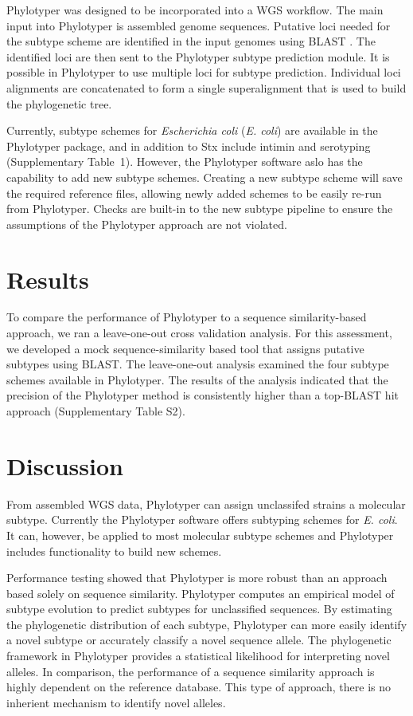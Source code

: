 \documentclass{bioinfo}
\begin{document}
Phylotyper was designed to be incorporated into a WGS workflow.  
The main input into Phylotyper is assembled genome sequences.  
Putative loci needed for the subtype scheme are identified in the input genomes using BLAST \citep{Camacho2009}.
The identified loci are then sent to the Phylotyper subtype prediction module.
It is possible in Phylotyper to use multiple loci for subtype prediction.
Individual loci alignments are concatenated to form a single superalignment that is used to build the phylogenetic tree.

Currently, subtype schemes for \emph{Escherichia coli} (\textit{E. coli}) are available in the Phylotyper package, and in addition to Stx include intimin and serotyping  (Supplementary Table~1).
However, the Phylotyper software aslo has the capability to add new subtype schemes. 
Creating a new subtype scheme will save the required reference files, allowing newly added schemes to be easily re-run from Phylotyper.
Checks are built-in to the new subtype pipeline to ensure the assumptions of the Phylotyper approach are not violated.  

\section{Results}

To compare the performance of Phylotyper to a sequence similarity-based approach, we ran a leave-one-out cross validation analysis.
For this assessment, we developed a mock sequence-similarity based tool that assigns putative subtypes using BLAST.
The leave-one-out analysis examined the four subtype schemes available in Phylotyper. The results of the analysis indicated that the precision of the Phylotyper method is consistently higher than a top-BLAST hit approach (Supplementary Table S2).

\section{Discussion}

From assembled WGS data, Phylotyper can assign unclassifed strains a molecular subtype.
Currently the Phylotyper software offers subtyping schemes for \textit{E. coli}.
It can, however, be applied to most molecular subtype schemes and Phylotyper includes functionality to build new schemes.

Performance testing showed that Phylotyper is more robust than an approach based solely on sequence similarity.
Phylotyper computes an empirical model of subtype evolution to predict subtypes for unclassified sequences.
By estimating the phylogenetic distribution of each subtype, Phylotyper can more easily identify a novel subtype or accurately classify a novel sequence allele.
The phylogenetic framework in Phylotyper provides a statistical likelihood for interpreting novel alleles.
In comparison, the performance of a sequence similarity approach is highly dependent on the reference database.
This type of approach, there is no inherient mechanism to identify novel alleles.
\end{document}
